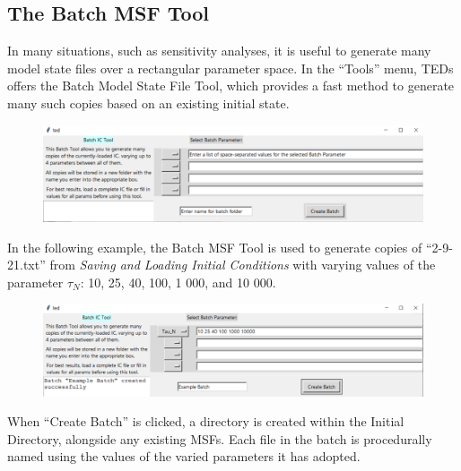 \documentclass[11pt,letterpaper,titlepage]{article}
\begin{document}
		\subsection{The Batch MSF Tool}
		
		\par In many situations, such as sensitivity analyses, it is useful to generate many model state files over a rectangular parameter space. In the “Tools” menu, TEDs offers the Batch Model State File Tool, which provides a fast method to generate many such copies based on an existing initial state.
		
		\begin{figure}[H]
			\label{fig:save_menu}
			\centering
			\includegraphics[scale=1]{"batch_blank"}
		\end{figure}
	
		\par In the following example, the Batch MSF Tool is used to generate copies of “2-9-21.txt” from \textit{Saving and Loading Initial Conditions} with varying values of the parameter $\tau_{N}$: 10, 25, 40, 100, 1 000, and 10 000.
	
		\begin{figure}[H]
			\label{fig:batch_example}
			\centering
			\includegraphics[scale=1]{"batch_example"}
		\end{figure}
	
		\par When “Create Batch” is clicked, a directory is created within the Initial Directory, alongside any existing MSFs. Each file in the batch is procedurally named using the values of the varied parameters it has adopted.
		
\end{document}
